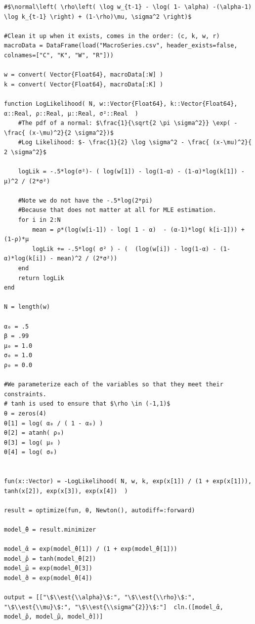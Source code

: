 \documentclass[12pt, letterpaper]{paper}
\begin{document}
\begin{verbatim}
#$\normal\left( \rho\left( \log w_{t-1} - \log( 1- \alpha) -(\alpha-1) \log k_{t-1} \right) + (1-\rho)\mu, \sigma^2 \right)$

#Clean it up when it exists, comes in the order: (c, k, w, r)
macroData = DataFrame(load("MacroSeries.csv", header_exists=false, colnames=["C", "K", "W", "R"]))

w = convert( Vector{Float64}, macroData[:W] )
k = convert( Vector{Float64}, macroData[:K] )

function LogLikelihood( N, w::Vector{Float64}, k::Vector{Float64}, α::Real, ρ::Real, μ::Real, σ²::Real  )
    #The pdf of a normal: $\frac{1}{\sqrt{2 \pi \sigma^2}} \exp( - \frac{ (x-\mu)^2}{2 \sigma^2})$
    #Log Likelihood: $- \frac{1}{2} \log \sigma^2 - \frac{ (x-\mu)^2}{ 2 \sigma^2}$

    logLik = -.5*log(σ²)- ( log(w[1]) - log(1-α) - (1-α)*log(k[1]) - μ)^2 / (2*σ²)

    #Note we do not have the -.5*log(2*pi)
    #Because that does not matter at all for MLE estimation.
    for i in 2:N
        mean = ρ*(log(w[i-1]) - log( 1 - α)  - (α-1)*log( k[i-1])) + (1-ρ)*μ
        logLik += -.5*log( σ² ) - (  (log(w[i]) - log(1-α) - (1-α)*log(k[i]) - mean)^2 / (2*σ²))
    end
    return logLik
end

N = length(w)

α₀ = .5
β = .99
μ₀ = 1.0
σ₀ = 1.0
ρ₀ = 0.0

#We parameterize each of the variables so that they meet their constraints.
# tanh is used to ensure that $\rho \in (-1,1)$
θ = zeros(4)
θ[1] = log( α₀ / ( 1 - α₀) )
θ[2] = atanh( ρ₀)
θ[3] = log( μ₀ )
θ[4] = log( σ₀)


fun(x::Vector) = -LogLikelihood( N, w, k, exp(x[1]) / (1 + exp(x[1])), tanh(x[2]), exp(x[3]), exp(x[4])  )

result = optimize(fun, θ, Newton(), autodiff=:forward)

model_̂θ = result.minimizer

model_̂α = exp(model_̂θ[1]) / (1 + exp(model_̂θ[1]))
model_̂ρ = tanh(model_̂θ[2])
model_̂μ = exp(model_̂θ[3])
model_̂σ = exp(model_̂θ[4])

output = [["\$\\est{\\alpha}\$:", "\$\\est{\\rho}\$:", "\$\\est{\\mu}\$:", "\$\\est{\\sigma^{2}}\$:"]  cln.([model_̂α, model_̂ρ, model_̂μ, model_̂σ])]
\end{verbatim}
\end{document}
